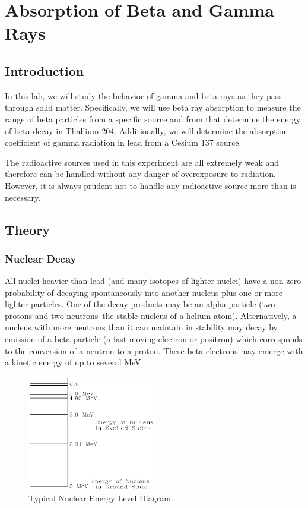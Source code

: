 \chapter{Absorption of Beta and Gamma Rays}

\section{Introduction}

In this lab, we will study the behavior of gamma and beta rays as they pass through solid matter. Specifically, we will use beta ray absorption to measure the range of beta particles from a specific source and from that determine the energy of beta decay in Thallium 204. Additionally, we will determine the absorption coefficient of gamma radiation in lead from a Cesium 137 source.\myskip

The radioactive sources used in this experiment are all extremely weak and therefore can be handled without any danger of overexposure to radiation. However, it is always prudent not to handle any radioactive source more than is necessary.

\section{Theory}
\subsection{Nuclear Decay}
All nuclei heavier than lead (and many isotopes of lighter nuclei) have a non-zero probability of decaying spontaneously into another nucleus plus one or more lighter particles. One of the decay products may be an alpha-particle (two protons and two neutrons--the stable nucleus of a helium atom). Alternatively, a nucleus with more neutrons than it can maintain in stability may decay by emission of a beta-particle (a fast-moving electron or positron) which corresponds to the conversion of a neutron to a proton. These beta electrons may emerge with a kinetic energy of up to several MeV.\myskip

\begin{figure}[h]
\centering
\includegraphics[width=0.5\textwidth]{./Exp10/pic/image1.png}
\caption{Typical Nuclear Energy Level Diagram.}
\label{fig:level}
\end{figure}

